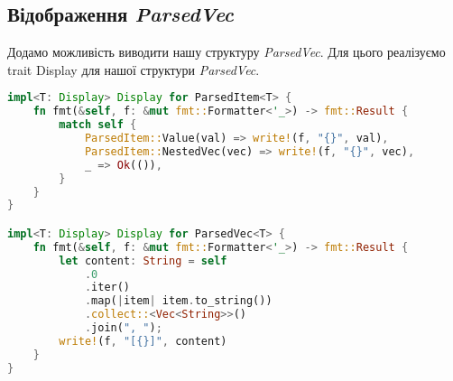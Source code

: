 \subsection{Відображення \textit{ParsedVec}}
Додамо можливість виводити нашу структуру \textit{ParsedVec}.
Для цього реалізуємо trait Display для нашої структури \textit{ParsedVec}.
\begin{lstlisting}[language=Rust, style=colouredRust]
impl<T: Display> Display for ParsedItem<T> {
    fn fmt(&self, f: &mut fmt::Formatter<'_>) -> fmt::Result {
        match self {
            ParsedItem::Value(val) => write!(f, "{}", val),
            ParsedItem::NestedVec(vec) => write!(f, "{}", vec),
            _ => Ok(()),
        }
    }
}

impl<T: Display> Display for ParsedVec<T> {
    fn fmt(&self, f: &mut fmt::Formatter<'_>) -> fmt::Result {
        let content: String = self
            .0
            .iter()
            .map(|item| item.to_string())
            .collect::<Vec<String>>()
            .join(", ");
        write!(f, "[{}]", content)
    }
}
\end{lstlisting}


\newpage
